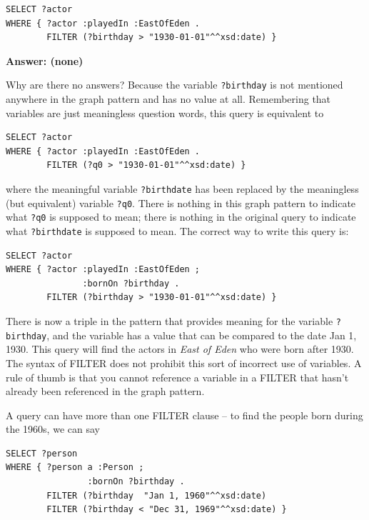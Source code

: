 \begin{lstlisting}
SELECT ?actor
WHERE { ?actor :playedIn :EastOfEden .
        FILTER (?birthday > "1930-01-01"^^xsd:date) }
\end{lstlisting}

\textbf{\textbf{Answer:} (none)}

Why are there no answers? Because the variable \texttt{?birthday} is not
mentioned anywhere in the graph pattern and has no value at all.
Remembering that variables are just meaningless question words, this
query is equivalent to


\begin{lstlisting}
SELECT ?actor
WHERE { ?actor :playedIn :EastOfEden .
        FILTER (?q0 > "1930-01-01"^^xsd:date) }
\end{lstlisting}

where the meaningful variable \texttt{?birthdate} has been replaced by the
meaningless (but equivalent) variable \texttt{?q0}. There is nothing in this
graph pattern to indicate what \texttt{?q0} is supposed to mean; there is nothing
in the original query to indicate what \texttt{?birthdate} is supposed to mean.
The correct way to write this query is:

\begin{lstlisting}
SELECT ?actor
WHERE { ?actor :playedIn :EastOfEden ;
               :bornOn ?birthday .
        FILTER (?birthday > "1930-01-01"^^xsd:date) }
\end{lstlisting}

There is now a triple in the pattern that provides meaning for the
variable \texttt{?birthday}, and the variable has a value that can be compared to
the date Jan 1, 1930. This query will find the actors in \emph{East of
Eden} who were born after 1930. The syntax of FILTER does not prohibit
this sort of incorrect use of variables. A rule of thumb is that you
cannot reference a variable in a FILTER that hasn't already been
referenced in the graph pattern.

A query can have more than one FILTER clause -- to find the people born
during the 1960s, we can say

\begin{lstlisting}
SELECT ?person
WHERE { ?person a :Person ;
                :bornOn ?birthday .
        FILTER (?birthday  "Jan 1, 1960"^^xsd:date)
        FILTER (?birthday < "Dec 31, 1969"^^xsd:date) }
\end{lstlisting}


